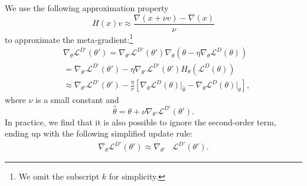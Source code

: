 We use the following approximation property 
\[
H(x)v \approx \frac{\nabla(x+\nu v) - \nabla(x)}{\nu}
\]
to approximate the meta-gradient:\footnote{We omit the subscript $k$ for simplicity.}
\begin{align*}
    &\nabla_\theta  \mathcal{L}^{D'}(\theta') = \nabla_{\theta'} \mathcal{L}^{D'}(\theta') 
    \nabla_{\theta}(\theta - \eta \nabla_{\theta} \mathcal{L}^{D}(\theta)) \\
    &= \nabla_{\theta'} \mathcal{L}^{D'}(\theta')
    - \eta \nabla_{\theta'} \mathcal{L}^{D'}(\theta') H_{\theta}(\mathcal{L}^{D}(\theta)) \\
    &\approx 
    \nabla_{\theta'} \mathcal{L}^{D'}(\theta')
    - \frac{\eta}{\nu} \left[
    \nabla_{\theta}\mathcal{L}^D(\theta)\bigg|_{\hat{\theta}}
    - \nabla_{\theta}\mathcal{L}^D(\theta)\bigg|_{\theta} 
    \right],
\end{align*}
where $\nu$ is a small constant and 
\[
\hat{\theta} = \theta + \nu \nabla_{\theta'}\mathcal{L}^{D'}(\theta').
\]
In practice, we find that it is also possible to ignore the second-order term, ending up with the following simplified update rule:
\begin{align}
\label{eq:meta-grad-first}
    \nabla_\theta \mathcal{L}^{D'}(\theta') \approx
    \nabla_{\theta'} & \mathcal{L}^{D'}(\theta').
\end{align}






